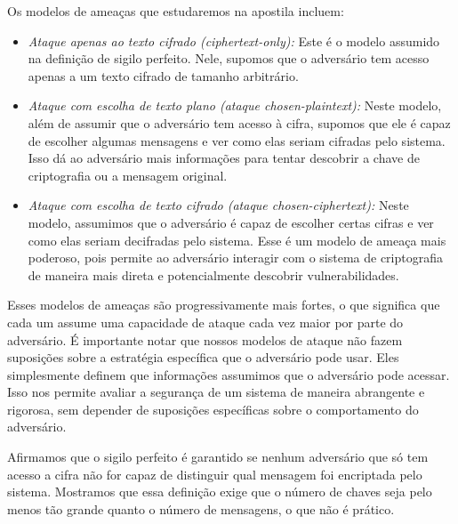 Os modelos de ameaças que estudaremos na apostila incluem:
\begin{itemize}
\item {\em Ataque apenas ao texto cifrado (ciphertext-only):} 
  Este é o modelo assumido na definição de sigilo perfeito.
  Nele, supomos que o adversário tem acesso apenas a um texto cifrado de tamanho arbitrário.
\item {\em Ataque com escolha de texto plano (ataque chosen-plaintext):}
  Neste modelo, além de assumir que o adversário tem acesso à cifra, supomos que ele é capaz de escolher algumas mensagens e ver como elas seriam cifradas pelo sistema.
  Isso dá ao adversário mais informações para tentar descobrir a chave de criptografia ou a mensagem original.
\item {\em Ataque com escolha de texto cifrado (ataque chosen-ciphertext):}
  Neste modelo, assumimos que o adversário é capaz de escolher certas cifras e ver como elas seriam decifradas pelo sistema.
  Esse é um modelo de ameaça mais poderoso, pois permite ao adversário interagir com o sistema de criptografia de maneira mais direta e potencialmente descobrir vulnerabilidades.
\end{itemize}

Esses modelos de ameaças são progressivamente mais fortes, o que significa que cada um assume uma capacidade de ataque cada vez maior por parte do adversário.
É importante notar que nossos modelos de ataque não fazem suposições sobre a estratégia específica que o adversário pode usar.
Eles simplesmente definem que informações assumimos que o adversário pode acessar.
Isso nos permite avaliar a segurança de um sistema de maneira abrangente e rigorosa, sem depender de suposições específicas sobre o comportamento do adversário.

Afirmamos que o sigilo perfeito é garantido se nenhum adversário que só tem acesso a cifra não for capaz de distinguir qual mensagem foi encriptada pelo sistema.
Mostramos que essa definição exige que o número de chaves seja pelo menos tão grande quanto o número de mensagens, o que não é prático.

